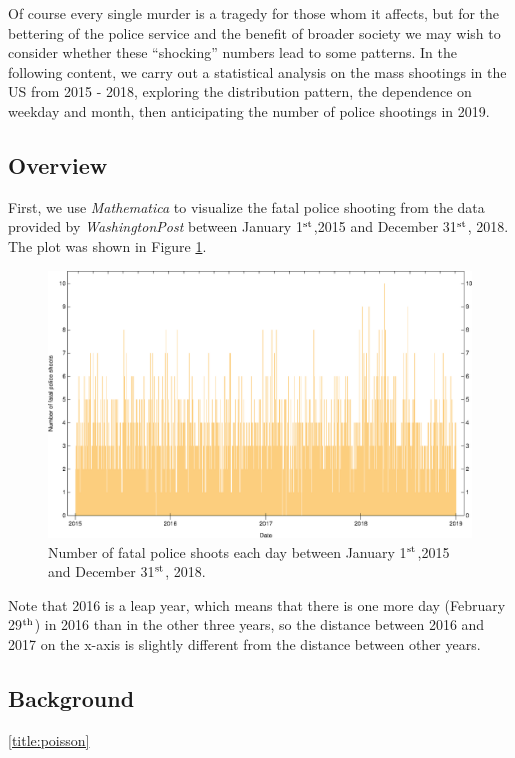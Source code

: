 \documentclass[conf]{new-aiaa}
\begin{document}
Of course every single murder is a tragedy for those whom it affects, but for the bettering of the police service and the benefit of broader society we may wish to consider whether these ``shocking'' numbers lead to some patterns. In the following content, we carry out a statistical analysis on the mass shootings in the US from 2015 - 2018, exploring the distribution pattern, the dependence on weekday and month, then anticipating the number of police shootings in 2019.

\subsection{Overview}

First, we use \emph{Mathematica} to visualize the fatal police shooting from the data provided by \emph{WashingtonPost}\cite{washingtonpost} between January 1$^{\rm st}$,2015 and December 31$^{\rm st}$, 2018. The plot was shown in Figure \ref{fig:q2}.

\begin{figure}[!htbp]
	\centering
	\includegraphics[width=0.9\linewidth]{q2/q2.eps}
	\caption{Number of fatal police shoots each day between January 1$^{\rm st}$,2015 and December 31$^{\rm st}$, 2018.}
	\label{fig:q2}
\end{figure}

Note that 2016 is a leap year, which means that there is one more day (February 29$^{\rm th}$) in 2016 than in the other three years, so the distance between 2016 and 2017 on the x-axis is slightly different from the distance between other years.

\subsection{Background}\ref{title:poisson}
\end{document}
